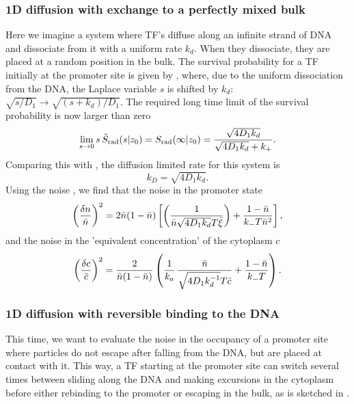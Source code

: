 \subsubsection{1D diffusion with exchange to a perfectly mixed bulk}
Here we imagine a system where TF's diffuse along an infinite strand of DNA and dissociate from it with a uniform rate $k_d$. When they dissociate, they are placed at a random position in the bulk. The survival probability for a TF initially at the promoter site is given by , where, due to the uniform dissociation from the DNA, the Laplace variable $s$ is shifted by $k_d$: $\sqrt{s/D_1} \to \sqrt{(s+k_d)/D_1}$. The required long time limit of the survival probability is now larger than zero
\begin{equation}
 \lim_{s\to0} s \, \hat{S}_{\rm rad}(s|z_0) = S_{\rm rad}(\infty|z_0) = \frac{\sqrt{4 D_1 k_d}}{\sqrt{4 D_1 k_d} + k_+}.
\end{equation}
Comparing this with , the diffusion limited rate for this system is
\begin{equation}
k_D = \sqrt{4 D_1 k_d}.
\end{equation}
Using the noise , we find that the noise in the promoter state
\begin{equation}
 \elabel{NoiseProWM}
 \left( \frac{\delta n}{\bar{n}} \right)^2 = 2 \bar{n}(1-\bar{n})\left[\left( \frac{1}{\bar{n} \sqrt{4 D_1 k_d} T \bar{\xi}} \right)+\frac{1-\bar{n}}{k_- T \bar{n}^2} \right],
\end{equation}
and the noise in the 'equivalent concentration' of the cytoplasm $c$
\begin{equation}
 \elabel{NoiseCWM} 
 \left( \frac{\delta c}{\bar{c}} \right)^2 = \frac{2}{\bar{n}(1-\bar{n})} \left( \frac{1}{k_a} \, \frac{\bar{n}}{\sqrt{4 D_1 k_d^{-1}} T \bar{c}} + \frac{1-\bar{n}}{k_- T}  \right).
\end{equation}


\subsubsection{1D diffusion with reversible binding to the DNA}
This time, we want to evaluate the noise in the occupancy of a promoter site where particles do not escape after falling from the DNA, but are placed at contact with it. This way, a TF starting at the promoter site can switch several times between sliding along the DNA and making excursions in the cytoplasm before either rebinding to the promoter or escaping in the bulk, as is sketched in . 

